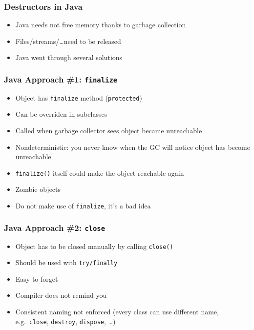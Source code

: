 \begin{frame}
  \frametitle{Destructors in Java}
  \begin{itemize}
    \item Java needs not free memory thanks to garbage collection
    \item Files/streams/\dots need to be released
    \item Java went through several solutions
  \end{itemize}
\end{frame}

\begin{frame}
  \frametitle{Java Approach \#1: {\tt finalize}}
  \begin{itemize}
    \item Object has {\tt finalize} method ({\tt protected})
    \item Can be overriden in subclasses
    \item Called when garbage collector sees object became unreachable
  \end{itemize}
  \vskip5mm
  \begin{itemize}
    \item Nondeterministic: you never know when the GC will notice object has become unreachable
    \item {\tt finalize()} itself could make the object reachable again
    \item Zombie objects
    \item Do not make use of {\tt finalize}, it's a bad idea
  \end{itemize}
\end{frame}

\begin{frame}
  \frametitle{Java Approach \#2: {\tt close}}
  \begin{itemize}
    \item Object has to be closed manually by calling {\tt close()}
    \item Should be used with {\tt try/finally}
  \end{itemize}
  \vskip5mm
  \begin{itemize}
    \item Easy to forget
    \item Compiler does not remind you
    \item Consistent naming not enforced (every class can use different name, e.g.\ {\tt close}, {\tt destroy}, {\tt dispose}, \dots)
  \end{itemize}
\end{frame}

